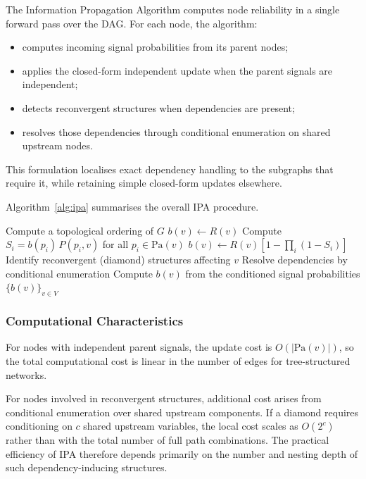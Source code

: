 \documentclass[preprint,12pt]{elsarticle}
\begin{document}
The Information Propagation Algorithm computes node reliability in a single forward pass over the DAG. For each node, the algorithm:
\begin{itemize}
    \item computes incoming signal probabilities from its parent nodes;
    \item applies the closed-form independent update when the parent signals are independent;
    \item detects reconvergent structures when dependencies are present;
    \item resolves those dependencies through conditional enumeration on shared upstream nodes.
\end{itemize}

This formulation localises exact dependency handling to the subgraphs that require it, while retaining simple closed-form updates elsewhere.

Algorithm~\ref{alg:ipa} summarises the overall IPA procedure.

\begin{algorithm}[h]
\caption{Information Propagation Algorithm (IPA)}
\label{alg:ipa}
\begin{algorithmic}[1]
\STATE Compute a topological ordering of $G$
        \STATE $b(v) \gets R(v)$
    \ELSE
        \STATE Compute $S_i = b(p_i)\,P(p_i,v)$ for all $p_i \in \text{Pa}(v)$
            \STATE $b(v) \gets R(v)\left[1-\prod_i (1-S_i)\right]$
        \ELSE
            \STATE Identify reconvergent (diamond) structures affecting $v$
            \STATE Resolve dependencies by conditional enumeration
            \STATE Compute $b(v)$ from the conditioned signal probabilities
        \ENDIF
    \ENDIF
\ENDFOR
\RETURN $\{b(v)\}_{v \in V}$
\end{algorithmic}
\end{algorithm}

\subsubsection{Computational Characteristics}

For nodes with independent parent signals, the update cost is $O(|\text{Pa}(v)|)$, so the total computational cost is linear in the number of edges for tree-structured networks.

For nodes involved in reconvergent structures, additional cost arises from conditional enumeration over shared upstream components. If a diamond requires conditioning on $c$ shared upstream variables, the local cost scales as $O(2^c)$ rather than with the total number of full path combinations. The practical efficiency of IPA therefore depends primarily on the number and nesting depth of such dependency-inducing structures.
\end{document}

